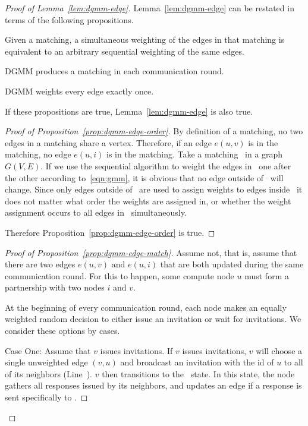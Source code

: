 \begin{proof}[Proof of Lemma~\ref{lem:dgmm-edge}]
  Lemma~\ref{lem:dgmm-edge} can be restated in terms of the following propositions.
  \begin{lprp}
    \label{prop:dgmm-edge-order}
    Given a matching, a simultaneous weighting of the edges in that matching is equivalent to an arbitrary sequential weighting of the same edges.
  \end{lprp}
  \begin{lprp}
    \label{prop:dgmm-edge-match}
    DGMM produces a matching in each communication round.
  \end{lprp}
  \begin{lprp}
    \label{prop:dgmm-edge-once}
    DGMM weights every edge exactly once.
  \end{lprp}
  If these propositions are true, Lemma~\ref{lem:dgmm-edge} is also true. 
  
  \begin{proof}[Proof of Proposition~\ref{prop:dgmm-edge-order}]
    By definition of a matching, no two edges in a matching share a vertex. Therefore, if an edge $e(u,v)$ is in the matching, no edge $e(u,i)$ is in the matching. 
    Take a matching \bMd\ in a graph $G(V,E)$. If we use the sequential algorithm to weight the edges in \bMd\ one after the other according to~\eqref{eqn:gmm}, it is obvious that no edge outside of \bMd\ will change. Since only edges outside of \bMd\ are used to assign weights to edges inside \bMd\, it does not matter what order the weights are assigned in, or whether the weight assignment occurs to all edges in \bMd\ simultaneously.
    
    Therefore Proposition~\ref{prop:dgmm-edge-order} is true.
  \end{proof}
  \begin{proof}[Proof of Proposition~\ref{prop:dgmm-edge-match}]
    Assume not, that is, assume that there are two edges $e(u,v) \text{ and } e(u,i)$ that are both updated during the same communication round. For this to happen, some compute node $u$ must form a partnership with two nodes $i$ and $v$. 
    
At the beginning of every communication round, each node makes an equally weighted random decision to either issue an invitation or wait for invitations. We consider these options by cases.

    Case One: Assume that $v$ issues invitations. If $v$ issues invitations, $v$ will choose a single unweighted edge $(v,u)$ and broadcast an invitation with the id of $u$ to all of its neighbors (Line~). $v$ then transitions to the \cWd\ state. In this state, the node gathers all responses issued by its neighbors, and updates an edge if a response is sent specifically to .


\end{proof}
\end{proof}
